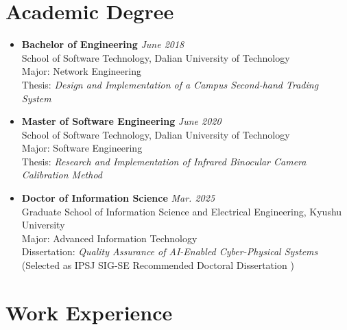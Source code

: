 \documentclass[11pt,a4paper]{moderncv}        %
\begin{document}
\section{Academic Degree}
\begin{itemize}[label={}]
    \item \textbf{Bachelor of Engineering} \hfill \textit{June 2018}\\
        School of Software Technology, Dalian University of Technology\\
        Major: Network Engineering \\
        Thesis: \emph{Design and Implementation of a Campus Second-hand Trading System} 
    \item \textbf{Master of Software Engineering} \hfill \textit{June 2020}\\
        School of Software Technology, Dalian University of Technology\\
        Major: Software Engineering \\
        Thesis: \emph{Research and Implementation of Infrared Binocular Camera Calibration Method} 
    \item \textbf{Doctor of Information Science} \hfill \textit{Mar. 2025}\\
        Graduate School of Information Science and Electrical Engineering, Kyushu University \\
        Major: Advanced Information Technology \\
        Dissertation: \emph{Quality Assurance of AI-Enabled Cyber-Physical Systems} \\ 
        (Selected as IPSJ SIG-SE Recommended Doctoral Dissertation ) 
\end{itemize}

\section{Work Experience}
\end{document}
